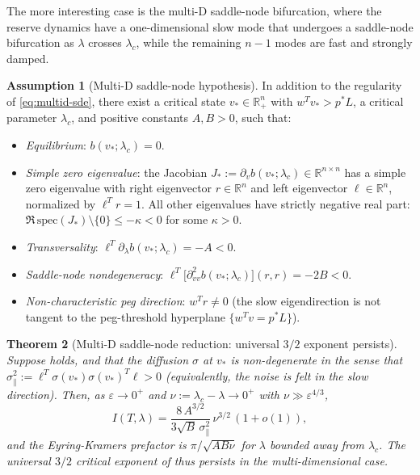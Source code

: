 \documentclass[11pt,a4paper]{article}
\theoremstyle{plain}
\newtheorem{theorem}{Theorem}[section]
\theoremstyle{definition}
\newtheorem{assumption}[theorem]{Assumption}
\newcommand{\R}{\mathbb{R}}
\newcommand{\eps}{\varepsilon}
\begin{document}
The more interesting case is the multi-D saddle-node bifurcation, where the reserve dynamics have a one-dimensional slow mode that undergoes a saddle-node bifurcation as $\lambda$ crosses $\lambda_c$, while the remaining $n-1$ modes are fast and strongly damped.

\begin{assumption}[Multi-D saddle-node hypothesis]
\label{assump:multid-saddle}
In addition to the regularity of \eqref{eq:multid-sde}, there exist a critical state $v_* \in \R^n_+$ with $w^T v_* > p^* L$, a critical parameter $\lambda_c$, and positive constants $A, B > 0$, such that:
\begin{itemize}
\item[(M1)] \emph{Equilibrium}: $b(v_*;\lambda_c) = 0$.
\item[(M2)] \emph{Simple zero eigenvalue}: the Jacobian $J_* := \partial_v b(v_*;\lambda_c) \in \R^{n\times n}$ has a simple zero eigenvalue with right eigenvector $r \in \R^n$ and left eigenvector $\ell \in \R^n$, normalized by $\ell^T r = 1$. All other eigenvalues have strictly negative real part: $\Re\,\text{spec}(J_*)\setminus\{0\} \leq -\kappa < 0$ for some $\kappa > 0$.
\item[(M3)] \emph{Transversality}: $\ell^T \partial_\lambda b(v_*;\lambda_c) = -A < 0$.
\item[(M4)] \emph{Saddle-node nondegeneracy}: $\ell^T\big[\partial^2_{vv} b(v_*;\lambda_c)\big](r,r) = -2B < 0$.
\item[(M5)] \emph{Non-characteristic peg direction}: $w^T r \neq 0$ (the slow eigendirection is not tangent to the peg-threshold hyperplane $\{w^T v = p^* L\}$).
\end{itemize}
\end{assumption}

\begin{theorem}[Multi-D saddle-node reduction: universal $3/2$ exponent persists]
\label{thm:multid-saddle}
Suppose  holds, and that the diffusion $\sigma$ at $v_*$ is non-degenerate in the sense that $\sigma_\|^2 := \ell^T\sigma(v_*)\sigma(v_*)^T\ell > 0$ (equivalently, the noise is felt in the slow direction). Then, as $\eps \to 0^+$ and $\nu := \lambda_c - \lambda \to 0^+$ with $\nu \gg \eps^{4/3}$,
\begin{equation}
    I(T,\lambda) = \frac{8\,A^{3/2}}{3\sqrt B\,\sigma_\|^2}\,\nu^{3/2}\,(1+o(1)),
    \label{eq:multid-rate}
\end{equation}
and the Eyring-Kramers prefactor is $\pi/\sqrt{AB\nu}$ for $\lambda$ bounded away from $\lambda_c$. The universal $3/2$ critical exponent of  thus persists in the multi-dimensional case.
\end{theorem}
\end{document}
